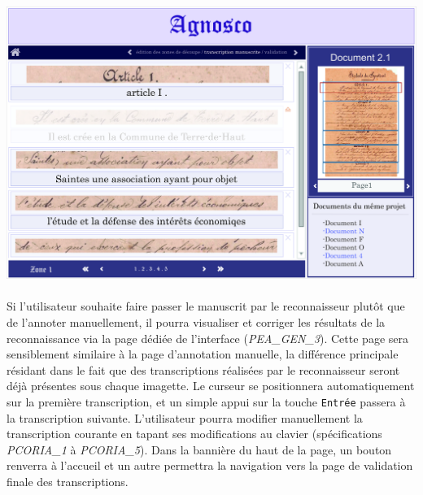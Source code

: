\begin{mdframed}[frametitle={Figure 4 : Maquette de la page d'annotation manuelle}, innerbottommargin=10]
\begin{center}
\includegraphics[scale=0.04]{assets/maquetteIHMtranscriptionmanu.jpg}
\end{center}
\end{mdframed}

\paragraph{}
Si l’utilisateur souhaite faire passer le manuscrit par le reconnaisseur plutôt que de l’annoter manuellement, il pourra visualiser et corriger les résultats de la reconnaissance via la page dédiée de l’interface (\textit{PEA\_GEN\_3}). Cette page sera sensiblement similaire à la page d’annotation manuelle, la différence principale résidant dans le fait que des transcriptions réalisées par le reconnaisseur seront déjà présentes sous chaque imagette. Le curseur se positionnera automatiquement sur la première transcription, et un simple appui sur la touche \texttt{Entrée} passera à la transcription suivante. L’utilisateur pourra modifier manuellement la transcription courante en tapant ses modifications au clavier (spécifications \textit{PCORIA\_1} à \textit{PCORIA\_5}).
\newline{}
Dans la bannière du haut de la page, un bouton renverra à l’accueil et un autre permettra la navigation vers la page de validation finale des transcriptions.

\newpage{}

